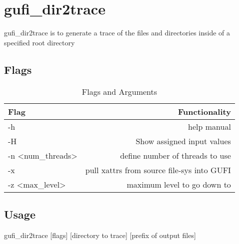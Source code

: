 \section{gufi\_dir2trace}
gufi\_dir2trace is to generate a trace of the files and directories inside of a specified root directory
\subsection{Flags}

\begin{table} [h]
\centering
\begin{tabular}{l|r}
Flag & Functionality \\\hline
-h & help manual \\
-H & Show assigned input values \\
-n \textless num\_threads\textgreater  & define number of threads to use \\
-x & pull xattrs from source file-sys into GUFI \\
-z \textless max\_level\textgreater & maximum level to go down to
\end{tabular}
\caption{\label{tab:widgets}Flags and Arguments}
\end{table}

\subsection{Usage}
gufi\_dir2trace [flags] [directory to trace] [prefix of output files]